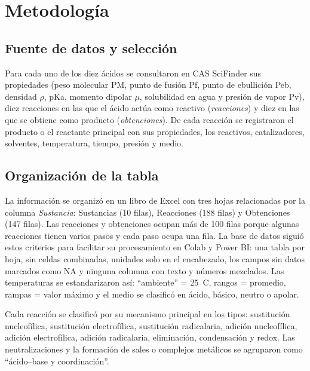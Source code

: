 \documentclass[twoside,twocolumn,10pt]{article}
\begin{document}
\section{Metodología}
\fontsize{12}{14}\selectfont
\subsection{Fuente de datos y selección}
Para cada uno de los diez ácidos se consultaron en CAS SciFinder sus propiedades (peso molecular PM, punto de fusión Pf, punto de ebullición Peb, densidad $\rho$, pKa, momento dipolar $\mu$, solubilidad en agua y presión de vapor Pv), diez reacciones en las que el ácido actúa como reactivo (\textit{reacciones}) y diez en las que se obtiene como producto (\textit{obtenciones}). De cada reacción se registraron el producto o el reactante principal con sus propiedades, los reactivos, catalizadores, solventes, temperatura, tiempo, presión y medio.

\subsection{Organización de la tabla}
La información se organizó en un libro de Excel con tres hojas relacionadas por la columna \textit{Sustancia}: Sustancias (10 filas), Reacciones (188 filas) y Obtenciones (147 filas). Las reacciones y obtenciones ocupan más de 100 filas porque algunas reacciones tienen varios pasos y cada paso ocupa una fila. La base de datos siguió estos criterios para facilitar su procesamiento en Colab y Power BI: una tabla por hoja, sin celdas combinadas, unidades solo en el encabezado, los campos sin datos marcados como NA y ninguna columna con texto y números mezclados. Las temperaturas se estandarizaron así: ``ambiente'' = 25~\textdegree C, rangos = promedio, rampas = valor máximo y el medio se clasificó en ácido, básico, neutro o apolar.

Cada reacción se clasificó por su mecanismo principal en los tipos: sustitución nucleofílica, sustitución electrofílica, sustitución radicalaria, adición nucleofílica, adición electrofílica, adición radicalaria, eliminación, condensación y redox. Las neutralizaciones y la formación de sales o complejos metálicos se agruparon como ``ácido--base y coordinación''.
\end{document}

